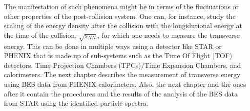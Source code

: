 The manifestation of such phenomena might be in terms of the fluctuations or other properties of the post-collision system. One can, for instance, study the scaling of the energy density after the collision with the longidutional energy at the time of the collision, $\sqrt{s_{NN}}$, for which one needs to measure the transverse energy. This can be done in multiple ways using a detector like STAR or PHENIX that is made up of sub-systems such as the Time Of Flight (TOF) detectors, Time Projection Chambers (TPCs)/Time Expansion Chambers, and calorimeters. The next chapter describes the measurement of transverse energy using BES data from PHENIX calorimeters. Also, the next chapter and the ones after it contain the procedures and the results of the analysis of the BES data from STAR using the identified particle spectra.

